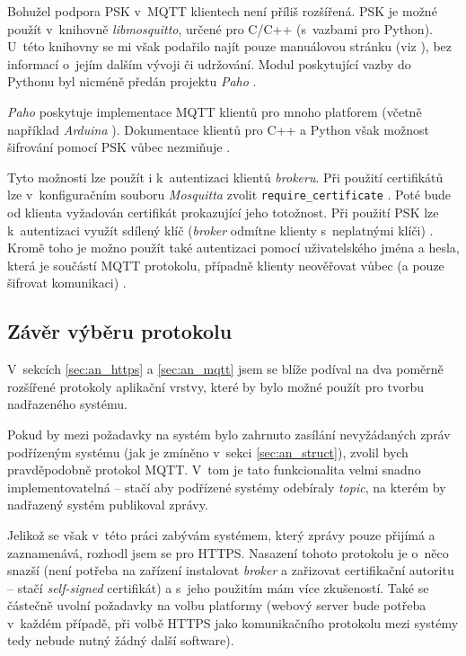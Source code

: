 Bohužel podpora PSK v~MQTT klientech není příliš rozšířená. PSK je možné použít v~knihovně \textit{libmosquitto}, určené pro C/C++ (s~vazbami pro Python). U~této knihovny se mi však podařilo najít pouze manuálovou stránku (viz \cite{libmosquitto_man}), bez informací o~jejím dalším vývoji či udržování. Modul poskytující vazby do Pythonu byl nicméně předán projektu \textit{Paho} \cite{mosquitto_python}.

\textit{Paho} poskytuje implementace MQTT klientů pro mnoho platforem (včetně například \textit{Arduina} \cite{paho_embedded}). Dokumentace klientů pro C++ a Python však možnost šifrování pomocí PSK vůbec nezmiňuje \cite{paho_cpp_doc} \cite{paho_pyt_doc}.

Tyto možnosti lze použít i k~autentizaci klientů \textit{brokeru}. Při použití certifikátů lze v~konfiguračním souboru \textit{Mosquitta} zvolit \verb|require_certificate| \cite{mqtt_mosquitto_conf}. Poté bude od klienta vyžadován certifikát prokazující jeho totožnost. Při použití PSK lze k~autentizaci využít sdílený klíč (\textit{broker} odmítne klienty s~neplatnými klíči) \cite{mqtt_mosquitto_conf}. Kromě toho je možno použít také autentizaci pomocí uživatelského jména a hesla, která je součástí MQTT protokolu, případně klienty neověřovat vůbec (a pouze šifrovat komunikaci) \cite{mqtt_mosquitto_conf}.

\subsection{Závěr výběru protokolu}

V~sekcích \ref{sec:an_https} a \ref{sec:an_mqtt} jsem se blíže podíval na dva poměrně rozšířené protokoly aplikační vrstvy, které by bylo možné použít pro tvorbu nadřazeného systému.

Pokud by mezi požadavky na systém bylo zahrnuto zasílání nevyžádaných zpráv podřízeným systému (jak je zmíněno v~sekci \ref{sec:an_struct}), zvolil bych pravděpodobně protokol MQTT. V~tom je tato funkcionalita velmi snadno implementovatelná -- stačí aby podřízené systémy odebíraly \textit{topic}, na kterém by nadřazený systém publikoval zprávy.

Jelikož se však v~této práci zabývám systémem, který zprávy pouze přijímá a zaznamenává, rozhodl jsem se pro HTTPS. Nasazení tohoto protokolu je o~něco snazší (není potřeba na zařízení instalovat \textit{broker} a zařizovat certifikační autoritu -- stačí \textit{self-signed} certifikát) a s~jeho použitím mám více zkušeností. Také se částečně uvolní požadavky na volbu platformy (webový server bude potřeba v~každém případě, při volbě HTTPS jako komunikačního protokolu mezi systémy tedy nebude nutný žádný další software). 

